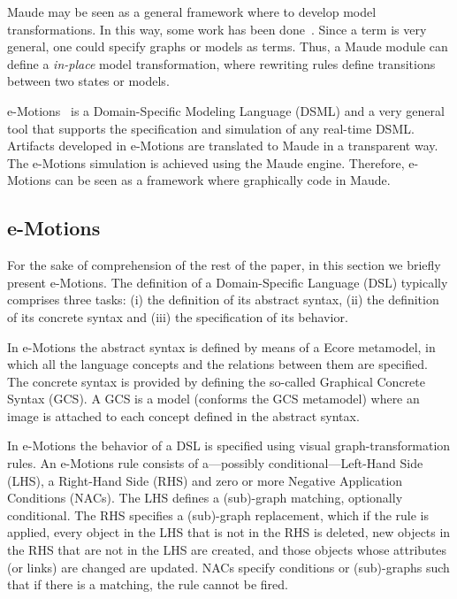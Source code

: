 

Maude may be seen as a general framework where to develop model transformations. In this way, some work has been done~\cite{TroyaV10}. Since a term is very general, one could specify graphs or models as terms. Thus, a Maude module can define a \textit{in-place} model transformation, where rewriting rules define transitions between two states or models.

e-Motions~\cite{RiveraDV10} is a Domain-Specific Modeling Language (DSML) and a very general tool that supports the specification and simulation of any real-time DSML. Artifacts developed in e-Motions are translated to Maude in a transparent way. The e-Motions simulation is achieved using the Maude engine. Therefore, e-Motions can be seen as a framework where graphically code in Maude.

\subsection{e-Motions}\label{sub:emotions}
For the sake of comprehension of the rest of the paper, in this section we briefly present e-Motions. The definition of a Domain-Specific Language (DSL) typically comprises three tasks: (i) the definition of its abstract syntax, (ii) the definition of its concrete syntax and (iii) the specification of its behavior.

In e-Motions the abstract syntax is defined by means of a Ecore metamodel, in which all the language concepts and the relations between them are specified. The concrete syntax is provided by defining the so-called Graphical Concrete Syntax (GCS). A GCS is a model (conforms the GCS metamodel) where an image is attached to each concept defined in the abstract syntax.

In e-Motions the behavior of a DSL is specified using visual graph-transformation rules. An e-Motions rule consists of a---possibly conditional---Left-Hand Side (LHS), a Right-Hand Side (RHS) and zero or more Negative Application Conditions (NACs). The LHS defines a (sub)-graph matching, optionally conditional. The RHS specifies a (sub)-graph replacement, which if the rule is applied, every object in the LHS that is not in the RHS is deleted, new objects in the RHS that are not in the LHS are created, and those objects whose attributes (or links) are changed are updated. NACs specify conditions or (sub)-graphs such that if there is a matching, the rule cannot be fired.

